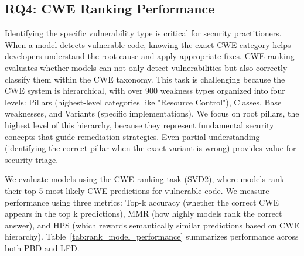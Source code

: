\documentclass[lettersize,journal]{IEEEtran}
\begin{document}
\subsection{RQ4: \gls{CWE} Ranking Performance}
\label{section:rq4}

Identifying the specific vulnerability type is critical for security practitioners. When a model detects vulnerable code, knowing the exact \gls{CWE} category helps developers understand the root cause and apply appropriate fixes. \gls{CWE} ranking evaluates whether models can not only detect vulnerabilities but also correctly classify them within the \gls{CWE} taxonomy. This task is challenging because the \gls{CWE} system is hierarchical, with over 900 weakness types organized into four levels: Pillars (highest-level categories like "Resource Control"), Classes, Base weaknesses, and Variants (specific implementations). We focus on root pillars, the highest level of this hierarchy, because they represent fundamental security concepts that guide remediation strategies. Even partial understanding (identifying the correct pillar when the exact variant is wrong) provides value for security triage.

We evaluate models using the \gls{CWE} ranking task (SVD2), where models rank their top-5 most likely \gls{CWE} predictions for vulnerable code. We measure performance using three metrics: Top-k accuracy (whether the correct \gls{CWE} appears in the top k predictions), \gls{MMR} (how highly models rank the correct answer), and \gls{HPS} (which rewards semantically similar predictions based on \gls{CWE} hierarchy). Table~\ref{tab:rank_model_performance} summarizes performance across both PBD and LFD.
\end{document}
